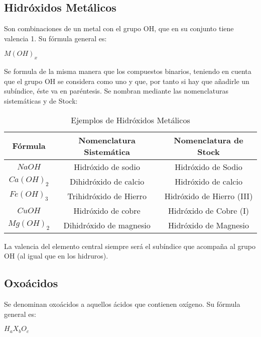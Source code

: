 \subsection{Hidróxidos Metálicos}
Son combinaciones de un metal con el grupo OH, que en su conjunto tiene valencia 1. Su fórmula general es:
\begin{center}
	$M(OH)_x$
\end{center}
Se formula de la misma manera que los compuestos binarios, teniendo en cuenta que el grupo OH se considera como uno y que, por tanto si hay que añadirle un subíndice, éste va en paréntesis. Se nombran mediante las nomenclaturas sistemáticas y de Stock:
\begin{table}[h!]
	\centering
	\begin{tabular}{c|cc}
		Fórmula&Nomenclatura Sistemática&Nomenclatura de Stock\\ \hline
		$NaOH$&Hidróxido de sodio&Hidróxido de Sodio\\ 
		$Ca(OH)_{2}$&Dihidróxido de calcio&Hidróxido de calcio\\
		$Fe(OH)_{3}$&Trihidróxido de Hierro&Hidróxido de Hierro (III)\\
		$CuOH$&Hidróxido de cobre&Hidróxido de Cobre (I)\\
		$Mg(OH)_{2}$&Dihidróxido de magnesio&Hidróxido de Magnesio\\ \hline
	\end{tabular}
	\caption{Ejemplos de Hidróxidos Metálicos}
\end{table}
La valencia del elemento central siempre será el subíndice que acompaña al grupo OH (al igual que en los hidruros).
\subsection{Oxoácidos}
Se denominan oxoácidos a aquellos ácidos que contienen oxígeno. Su fórmula general es:
\begin{center}
	$H_{a}X_{b}O_{c}$
\end{center}

